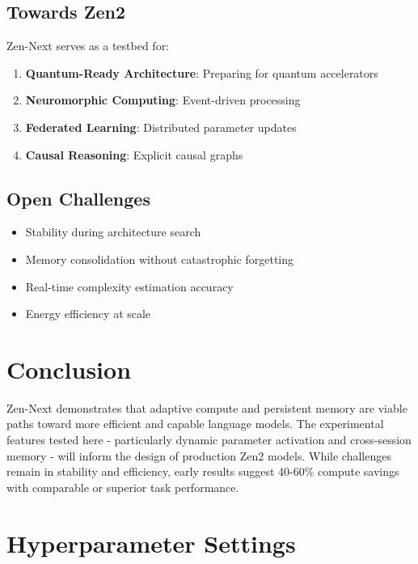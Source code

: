 \documentclass[11pt,a4paper]{article}
\theoremstyle{definition}
\begin{document}
\subsection{Towards Zen2}

Zen-Next serves as a testbed for:
\begin{enumerate}
\item \textbf{Quantum-Ready Architecture}: Preparing for quantum accelerators
\item \textbf{Neuromorphic Computing}: Event-driven processing
\item \textbf{Federated Learning}: Distributed parameter updates
\item \textbf{Causal Reasoning}: Explicit causal graphs
\end{enumerate}

\subsection{Open Challenges}

\begin{itemize}
\item Stability during architecture search
\item Memory consolidation without catastrophic forgetting
\item Real-time complexity estimation accuracy
\item Energy efficiency at scale
\end{itemize}

\section{Conclusion}

Zen-Next demonstrates that adaptive compute and persistent memory are viable paths toward more efficient and capable language models. The experimental features tested here - particularly dynamic parameter activation and cross-session memory - will inform the design of production Zen2 models. While challenges remain in stability and efficiency, early results suggest 40-60\% compute savings with comparable or superior task performance.

\appendix

\section{Hyperparameter Settings}
\end{document}
